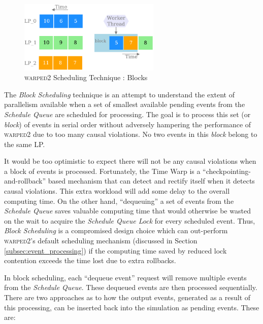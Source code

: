 \documentclass[11pt]{book}
\begin{document}
\begin{figure}
    \centering
    \includegraphics[width=0.6\textwidth]{figures/block.pdf}
    \caption{\textsc{warped2} Scheduling Technique : Blocks}\label{fig:blocks}
\end{figure}

The \emph{Block Scheduling} technique is an attempt to understand the extent of parallelism available when a
set of smallest available pending events from the \emph{Schedule Queue} are scheduled for processing.  The
goal is to process this set (or \emph{block}) of events in serial order without adversely hampering the
performance of \textsc{warped2} due to too many causal violations.  No two events in this \emph{block} belong
to the same LP.

It would be too optimistic to expect there will not be any causal violations when a block of events is
processed.  Fortunately, the Time Warp is a ``checkpointing-and-rollback'' based mechanism that can detect and
rectify itself when it detects causal violations.  This extra workload will add some delay to the overall
computing time.  On the other hand, ``dequeuing'' a set of events from the \emph{Schedule Queue} saves
valuable computing time that would otherwise be wasted on the wait to acquire the \emph{Schedule Queue Lock}
for every scheduled event.  Thus, \emph{Block Scheduling} is a compromised design choice which can out-perform
\textsc{warped2}'s default scheduling mechanism (discussed in Section \ref{subsec:event_processing}) if the
computing time saved by reduced lock contention exceeds the time lost due to extra rollbacks.

In block scheduling, each ``dequeue event'' request will remove multiple events from the \emph{Schedule
  Queue}.  These dequeued events are then processed sequentially. There are two approaches as to how the
output events, generated as a result of this processing, can be inserted back into the simulation as pending
events.  These are:
\end{document}
